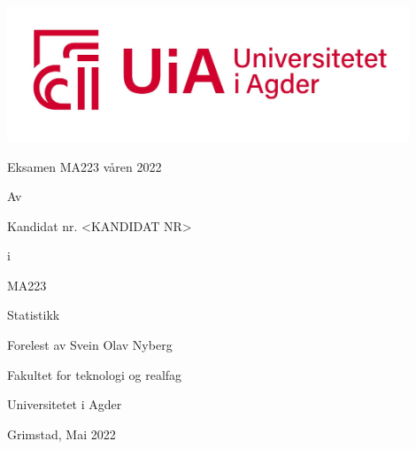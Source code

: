 \thispagestyle{empty}
\begin{center}
\vspace*{-2cm}
\includegraphics[width=120mm]{uia_logo.jpg}
\vspace{2cm}

{\LARGE Eksamen MA223 våren 2022}
\vspace{0.2cm}

Av
\vspace{0.5cm}

{\large Kandidat nr. <KANDIDAT NR>}
\vspace{0.1cm}

i

\vspace{0.5cm}

MA223

Statistikk
\vspace{0.8cm}

Forelest av Svein Olav Nyberg
\vspace{0.2cm}

Fakultet for teknologi og realfag

Universitetet i Agder
\vspace{0.8cm}

{\large Grimstad, Mai 2022}

\end{center}

\vfill



\thispagestyle{empty}

\newpage